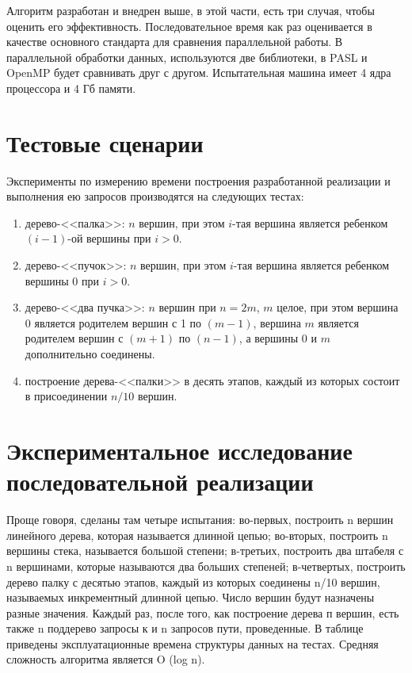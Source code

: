 \documentclass[specification,annotation]{itmo-student-thesis}
\newcommand{\revise}[1]{{\color{red!70!black} #1 }}
\begin{document}
\revise{
Алгоритм разработан и внедрен выше, в этой части, есть три случая, чтобы оценить его эффективность. Последовательное время как раз оценивается в качестве основного стандарта для сравнения параллельной 
работы. В параллельной обработки данных, используются две библиотеки, в PASL и OpenMP будет сравнивать друг с другом. Испытательная машина имеет 4 ядра процессора и 4 Гб памяти.
}

\section{Тестовые сценарии}

Эксперименты по измерению времени построения разработанной реализации и выполнения ею запросов производятся на следующих тестах:
\begin{enumerate}
    \item дерево-<<палка>>: $n$ вершин, при этом $i$-тая вершина является ребенком $(i-1)$-ой вершины при $i > 0$.
    \item дерево-<<пучок>>: $n$ вершин, при этом $i$-тая вершина является ребенком вершины 0 при $i > 0$.
    \item дерево-<<два пучка>>: $n$ вершин при $n = 2m$, $m$ целое, при этом вершина 0 является родителем вершин с 1 по $(m-1)$,
          вершина $m$ является родителем вершин с $(m+1)$ по $(n-1)$, а вершины 0 и $m$ дополнительно соединены.
    \item построение дерева-<<палки>> в десять этапов, каждый из которых состоит в присоединении $n / 10$ вершин.
\end{enumerate}

\section{Экспериментальное исследование последовательной реализации}

\revise{
Проще говоря, сделаны там четыре испытания: во-первых, построить n вершин линейного дерева, которая называется длинной цепью; во-вторых, построить n вершины стека, называется большой степени; в-третьих, 
построить два штабеля с n вершинами, которые называются два больших степеней; в-четвертых, построить дерево палку с десятью этапов, каждый из которых соединены n/10 вершин, называемых инкрементный длинной 
цепью. Число вершин будут назначены разные значения. Каждый раз, после того, как построение дерева п вершин, есть также n поддерево запросы к и n запросов пути, проведенные. В таблице приведены 
эксплуатационные времена структуры данных на тестах. Средняя сложность алгоритма является O (log n).
}
\end{document}
